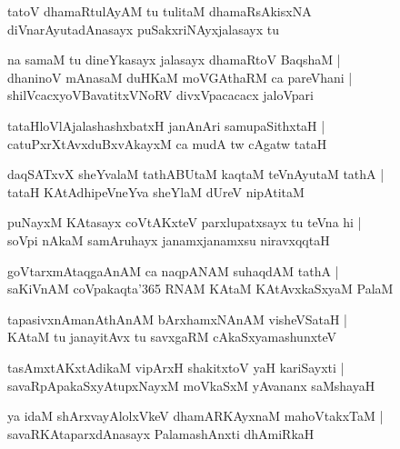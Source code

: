 \documentclass[twoside,12pt,openright]{book}
\newcounter{shloka}[chapter]
\begin{document}
\begin{shloka}%
tatoV dhamaRtulAyAM tu tulitaM dhamaRsAkisxNA \\
diVnarAyutadAnasayx puSakxriNAyxjalasayx tu 
\end{shloka}

\begin{shloka}%
na samaM tu dineYkasayx jalasayx dhamaRtoV BaqshaM |\\
dhaninoV mAnasaM duHKaM moVGAthaRM ca pareVhani |\\
shilVcacxyoVBavatitxVNoRV divxVpacacacx jaloVpari 
\end{shloka}

\begin{shloka}%
tataHloVlAjalashashxbatxH janAnAri samupaSithxtaH |\\
catuPxrXtAvxduBxvAkayxM ca mudA tw cAgatw tataH 	
\end{shloka}

\begin{shloka}%
daqSATxvX sheYvalaM tathABUtaM kaqtaM teVnAyutaM tathA |\\
tataH KAtAdhipeVneYva sheYlaM dUreV nipAtitaM 
\end{shloka}

\begin{shloka}%
puNayxM KAtasayx coVtAKxteV parxlupatxsayx tu teVna hi |\\
soVpi nAkaM samAruhayx janamxjanamxsu niravxqqtaH 
\end{shloka}

\begin{shloka}%
goVtarxmAtaqgaAnAM ca naqpANAM suhaqdAM tathA |\\
saKiVnAM coVpakaqta\char'365 RNAM KAtaM KAtAvxkaSxyaM PalaM 
\end{shloka}

\begin{shloka}%
tapasivxnAmanAthAnAM bArxhamxNAnAM visheVSataH |\\
KAtaM tu janayitAvx tu savxgaRM cAkaSxyamashunxteV 
\end{shloka}

\begin{shloka}%
tasAmxtAKxtAdikaM vipArxH shakitxtoV yaH kariSayxti |\\
savaRpApakaSxyAtupxNayxM moVkaSxM yAvananx saMshayaH 
\end{shloka}

\begin{shloka}%
ya idaM shArxvayAlolxVkeV dhamARKAyxnaM mahoVtakxTaM |\\
savaRKAtaparxdAnasayx PalamashAnxti dhAmiRkaH 
\end{shloka}
\end{document}
